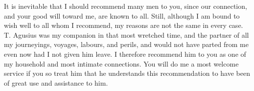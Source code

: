 

 It is inevitable that I should recommend many men to you, since our connection, and your good will toward me, are known to all. Still, although I am bound to wish well to all whom I recommend, my reasons are not the same in every case. T. Agusius was my companion in that most wretched time, and the partner of all my journeyings, voyages, labours, and perils, and would not have parted from me even now had I not given him leave. I therefore recommend him to you as one of my household and most intimate connections. You will do me a most welcome service if you so treat him that he understands this recommendation to have been of great use and assistance to him.
